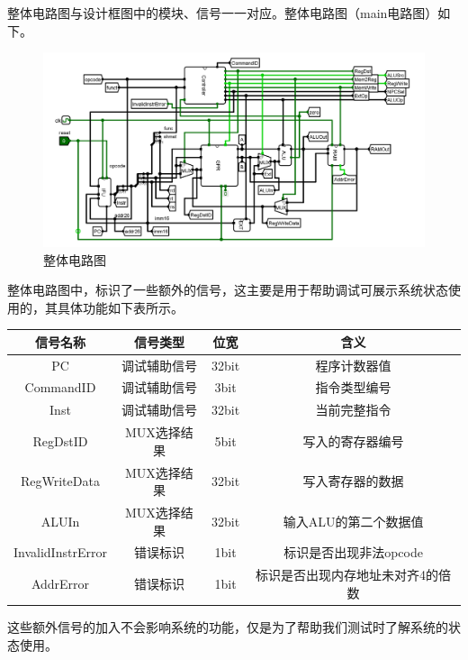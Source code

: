 \documentclass[main.tex]{subfiles}
\begin{document}
整体电路图与设计框图中的模块、信号一一对应。整体电路图（main电路图）如下。

\begin{figure}[h]
\centering
\includegraphics[width=\textwidth]{images/overall-circuit.png}
\caption{整体电路图}
\end{figure}

整体电路图中，标识了一些额外的信号，这主要是用于帮助调试可展示系统状态使用的，其具体功能如下表所示。

\begin{center}
    \begin{tabular}{c c c c}
        \toprule
        信号名称 & 信号类型 & 位宽 & 含义\\
        \midrule
        PC & 调试辅助信号 & 32bit & 程序计数器值 \\
        CommandID & 调试辅助信号 & 3bit & 指令类型编号 \\
        Inst & 调试辅助信号 & 32bit & 当前完整指令 \\
        RegDstID & MUX选择结果 & 5bit & 写入的寄存器编号 \\
        RegWriteData & MUX选择结果 & 32bit & 写入寄存器的数据 \\
        ALUIn & MUX选择结果 & 32bit & 输入ALU的第二个数据值 \\
        InvalidInstrError & 错误标识 & 1bit & 标识是否出现非法opcode \\
        AddrError & 错误标识 & 1bit & 标识是否出现内存地址未对齐4的倍数 \\
        \bottomrule
    \end{tabular}
\end{center}

这些额外信号的加入不会影响系统的功能，仅是为了帮助我们测试时了解系统的状态使用。
\end{document}
